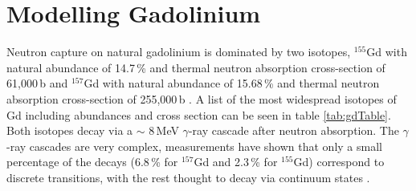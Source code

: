 \section{Modelling Gadolinium}\label{sec:GEANT4Simulation_modellingGadolinium}
Neutron capture on natural gadolinium is dominated by two isotopes, $^{155}$Gd with natural abundance of 14.7\,\% and thermal neutron absorption cross-section of 61,000\,b and $^{157}$Gd with natural abundance of 15.68\,\% and thermal neutron absorption cross-section of 255,000\,b \cite{Abdushukurov_2010}. A list of the most widespread isotopes of Gd including abundances and cross section can be seen in table \ref{tab:gdTable}. Both isotopes decay via a $\sim$ 8\,MeV $\gamma$-ray cascade after neutron absorption. The $\gamma$-ray cascades are very complex, measurements have shown that only a small percentage of the decays (6.8\,\% for $^{157}$Gd and 2.3\,\% for $^{155}$Gd) correspond to discrete transitions, with the rest thought to decay via continuum states \cite{jparc_gdProdNAbsorb_2016}. 

